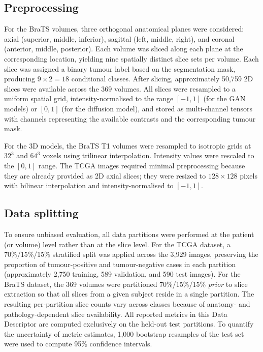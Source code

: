 \documentclass[11pt]{article}
\begin{document}
\subsection*{Preprocessing}

For the BraTS volumes, three orthogonal anatomical planes were considered: axial (superior, middle, inferior), sagittal (left, middle, right), and coronal (anterior, middle, posterior). Each volume was sliced along each plane at the corresponding location, yielding nine spatially distinct slice sets per volume. Each slice was assigned a binary tumour label based on the segmentation mask, producing $9 \times 2 = 18$ conditional classes. After slicing, approximately 50{,}759 2D slices were available across the 369 volumes. All slices were resampled to a uniform spatial grid, intensity-normalised to the range $[-1,1]$ (for the GAN models) or $[0,1]$ (for the diffusion model), and stored as multi-channel tensors with channels representing the available contrasts and the corresponding tumour mask.

For the 3D models, the BraTS T1 volumes were resampled to isotropic grids at $32^{3}$ and $64^{3}$ voxels using trilinear interpolation. Intensity values were rescaled to the $[0,1]$ range. The TCGA images required minimal preprocessing because they are already provided as 2D axial slices; they were resized to $128\!\times\!128$ pixels with bilinear interpolation and intensity-normalised to $[-1,1]$.

\subsection*{Data splitting}

To ensure unbiased evaluation, all data partitions were performed at the patient (or volume) level rather than at the slice level. For the TCGA dataset, a 70\%/15\%/15\% stratified split was applied across the 3{,}929 images, preserving the proportion of tumour-positive and tumour-negative cases in each partition (approximately 2{,}750 training, 589 validation, and 590 test images). For the BraTS dataset, the 369 volumes were partitioned 70\%/15\%/15\% \emph{prior} to slice extraction so that all slices from a given subject reside in a single partition. The resulting per-partition slice counts vary across classes because of anatomy- and pathology-dependent slice availability. All reported metrics in this Data Descriptor are computed exclusively on the held-out test partitions. To quantify the uncertainty of metric estimates, 1{,}000 bootstrap resamples of the test set were used to compute 95\% confidence intervals.
\end{document}
